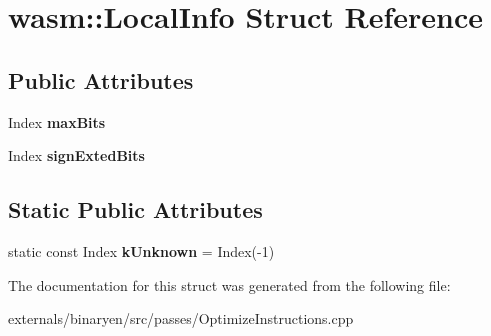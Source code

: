 \hypertarget{structwasm_1_1_local_info}{}\section{wasm\+:\+:Local\+Info Struct Reference}
\label{structwasm_1_1_local_info}
\subsection*{Public Attributes}
\begin{DoxyCompactItemize}
\item 
\mbox{\label{structwasm_1_1_local_info_a28f58a3182260e6028d16d07ebc911b5}} 
Index {\bfseries max\+Bits}
\item 
\mbox{\label{structwasm_1_1_local_info_a4b2927821095e8d6911a91e31bb42f45}} 
Index {\bfseries sign\+Exted\+Bits}
\end{DoxyCompactItemize}
\subsection*{Static Public Attributes}
\begin{DoxyCompactItemize}
\item 
\mbox{\label{structwasm_1_1_local_info_a10ba2898bda263741d59c8682031e17d}} 
static const Index {\bfseries k\+Unknown} = Index(-\/1)
\end{DoxyCompactItemize}


The documentation for this struct was generated from the following file\+:\begin{DoxyCompactItemize}
\item 
externals/binaryen/src/passes/Optimize\+Instructions.\+cpp\end{DoxyCompactItemize}
